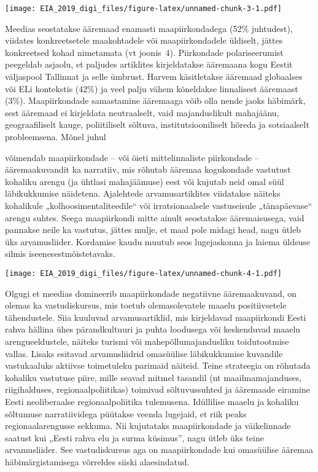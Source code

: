 \documentclass[]{book}
\begin{document}
\texttt{[image: EIA\_2019\_digi\_files/figure-latex/unnamed-chunk-3-1.pdf]}

Meedias seostatakse ääremaad enamasti maapiirkondadega (52\% juhtudest), viidates konkreetsetele
maakohtadele või maapiirkondadele üldiselt, jättes konkreetsed kohad nimetamata (vt joonis~4).
Piirkondade polariseerumist peegeldab asjaolu, et paljudes artiklites kirjeldatakse ääremaana kogu Eestit
väljaspool Tallinnat ja selle ümbrust. Harvem käsitletakse ääremaad globaalses või ELi kontekstis (42\%) ja
veel palju vähem kõneldakse linnalisest ääremaast (3\%). Maapiirkondade samastamine ääremaaga võib olla
nende jaoks häbimärk, sest ääremaad ei kirjeldata neutraalselt, vaid majanduslikult mahajäänu,
geograafiliselt kauge, poliitiliselt sõltuva, institutsiooniliselt hõreda ja sotsiaalselt probleemsena. Mõnel juhul

võimendab maapiirkondade -- või õieti mittelinnaliste piirkondade -- ääremaakuvandit ka narratiiv, mis
rõhutab ääremaa kogukondade vastutust kohaliku arengu (ja ühtlasi mahajäämuse) eest või kujutab neid
omal süül läbikukkumise näidetena. Ajalehtede arvamusartiklites viidatakse näiteks kohalikule
„kolhoosimentaliteedile`` või irratsionaalsele vastuseisule „tänapäevase`` arengu suhtes. Seega maapiirkondi
mitte ainult seostatakse ääremaisusega, vaid pannakse neile ka vastutus, jättes mulje, et maal pole midagi
head, nagu ütleb üks arvamusliider. Kordamise kaudu muutub seos lugejaskonna ja laiema üldsuse silmis
iseenesestmõistetavaks.

\texttt{[image: EIA\_2019\_digi\_files/figure-latex/unnamed-chunk-4-1.pdf]}

Olgugi et meedias domineerib maapiirkondade negatiivne ääremaakuvand, on olemas ka vastudiskursus, mis
toetub olemasolevatele maaelu positiivsetele tähendustele. Siia kuuluvad arvamusartiklid, mis kirjeldavad
maapiirkondi Eesti rahva hällina ühes pärandkultuuri ja puhta loodusega või keskenduvad maaelu
arengueeldustele, näiteks turismi või mahepõllumajandusliku toidutootmise vallas. Lisaks esitavad
arvamusliidrid omasüülise läbikukkumise kuvandile vastukaaluks aktiivse toimetuleku parimaid näiteid. Teine
strateegia on rõhutada kohaliku vastutuse piire, mille seavad mitmel tasandil (nt maailmamajanduses,
riigihalduses, regionaalpoliitikas) toimivad sõltuvussuhted ja ääremaade eiramine Eesti neoliberaalse
regionaalpoliitika tulemusena. Idüllilise maaelu ja kohaliku sõltumuse narratiividega püütakse veenda
lugejaid, et riik peaks regionaalarengusse sekkuma. Nii kujutataks maapiirkondade ja väikelinnade saatust
kui „Eesti rahva elu ja surma küsimus'', nagu ütleb üks teine arvamusliider. See vastudiskursus aga on
maapiirkondade kui omasüülise ääremaa häbimärgistamisega võrreldes siiski alaesindatud.
\end{document}

